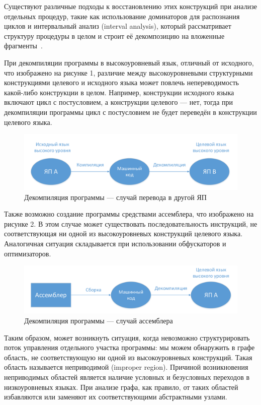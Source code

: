 Существуют различные подходы к восстановлению этих конструкций при анализе отдельных процедур, такие как использование доминаторов для распознания циклов и интервальный анализ (interval analysis), который рассматривает структуру процедуры в целом и строит её декомпозицию на вложенные фрагменты~\cite{controlflow}.


При декомпиляции программы в высокоуровневый язык, отличный от исходного, что изображено на рисунке 1, различие между высокоуровневыми структурными конструкциями целевого и исходного языка может повлечь непереводимость какой-либо конструкции в целом. Например, конструкции исходного языка включают цикл с постусловием, а конструкции целевого --- нет, тогда при декомпиляции программы цикл с постусловием не будет переведён в конструкции целевого языка.

\begin{figure}[H]
\includegraphics[width=1\linewidth]{Zabransky/gr1.pdf} 
\caption{Декомпиляция программы --- случай перевода в другой ЯП}
\end{figure}

Также возможно создание программы средствами ассемблера, что изображено на рисунке 2. В этом случае может существовать последовательность инструкций, не соответствующая ни одной из высокоуровневых конструкций целевого языка. Аналогичная ситуация складывается при использовании обфускаторов и оптимизаторов.

\begin{figure}[H]
\includegraphics[width=1\linewidth]{Zabransky/gr2.pdf} 
\caption{Декомпиляция программы --- случай ассемблера}
\end{figure}

Таким образом, может возникнуть ситуация, когда невозможно структурировать поток управления отдельного участка программы: мы можем обнаружить в графе область, не соответствующую ни одной из высокоуровневых конструкций. Такая область называется неприводимой (improper region). Причиной возникновения неприводимых областей является наличие условных и безусловных переходов в низкоуровневых языках. При анализе графа, как правило, от таких областей избавляются или заменяют их соответствующими абстрактными узлами.

